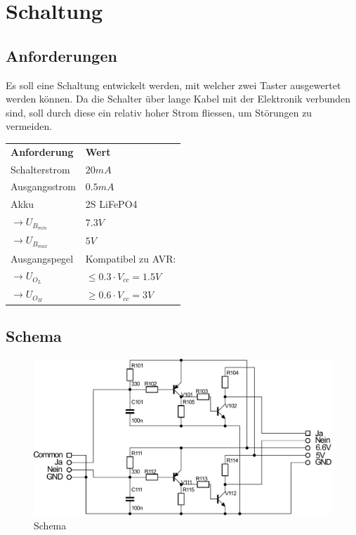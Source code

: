 
\section{Schaltung}

\subsection{Anforderungen}
Es soll eine Schaltung entwickelt werden, mit welcher zwei Taster ausgewertet werden können. Da die Schalter über lange Kabel mit der Elektronik verbunden sind, soll durch diese ein relativ hoher Strom fliessen, um Störungen zu vermeiden. 

\begin{table}[h!]
  \begin{tabular}{@{}ll}
    \textbf{Anforderung}        & \textbf{Wert} \\
    Schalterstrom               & $20 mA$ \\
    Ausgangsstrom               & $0.5 mA$ \\
    Akku                        & 2S LiFePO4 \\
    $\rightarrow U_{B_{min}}$   & $7.3 V$ \\
    $\rightarrow U_{B_{max}}$   & $5 V$ \\
    Ausgangspegel               & Kompatibel zu AVR: \\
    $\rightarrow U_{O_L}$       & $\leq 0.3 \cdot V_{cc} = 1.5 V$ \\
    $\rightarrow U_{O_H}$       & $\geq 0.6 \cdot V_{cc} = 3 V$ \\
    
  \end{tabular}
\end{table}

\subsection{Schema}
\begin{figure}[h!]
	\centering
	\includegraphics[scale=\schscale]{fig/xlr_pegelwandler_v_1_2_sch.pdf}
	\caption{Schema}
	\label{sch:pegw}
\end{figure}

